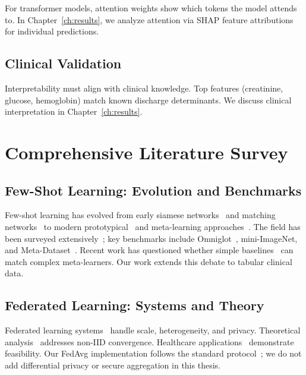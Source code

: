 For transformer models, attention weights show which tokens the model attends to. In Chapter~\ref{ch:results}, we analyze attention via SHAP feature attributions for individual predictions.

\subsection{Clinical Validation}

Interpretability must align with clinical knowledge. Top features (creatinine, glucose, hemoglobin) match known discharge determinants. We discuss clinical interpretation in Chapter~\ref{ch:results}.

\section{Comprehensive Literature Survey}

\subsection{Few-Shot Learning: Evolution and Benchmarks}

Few-shot learning has evolved from early siamese networks~\cite{koch2015siamese} and matching networks~\cite{vinyals2016matching} to modern prototypical~\cite{snell2017prototypical} and meta-learning approaches~\cite{finn2017model,ravi2017optimization}. The field has been surveyed extensively~\cite{wang2020generalizing}; key benchmarks include Omniglot~\cite{lake2015human}, mini-ImageNet, and Meta-Dataset~\cite{triantafillou2020meta}. Recent work has questioned whether simple baselines~\cite{dhillon2019baseline} can match complex meta-learners. Our work extends this debate to tabular clinical data.

\subsection{Federated Learning: Systems and Theory}

Federated learning systems~\cite{bonawitz2019towards,he2020fedml} handle scale, heterogeneity, and privacy. Theoretical analysis~\cite{karimireddy2020scaffold,reddi2020fedopt} addresses non-IID convergence. Healthcare applications~\cite{rieke2020future,kaissis2021secure,zhang2021federated} demonstrate feasibility. Our FedAvg implementation follows the standard protocol~\cite{mcmahan2017communication}; we do not add differential privacy or secure aggregation in this thesis.

